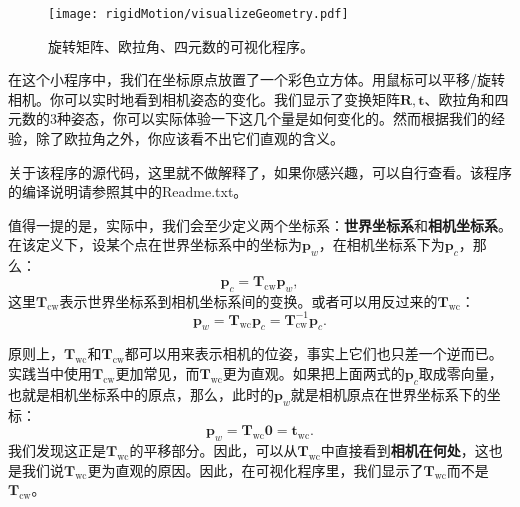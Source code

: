 \begin{figure}[!htp]
	\centering
	\texttt{[image: rigidMotion/visualizeGeometry.pdf]}
	\caption{旋转矩阵、欧拉角、四元数的可视化程序。}
	\label{fig:visualizeGeometry}
\end{figure}

在这个小程序中，我们在坐标原点放置了一个彩色立方体。用鼠标可以平移/旋转相机。你可以实时地看到相机姿态的变化。我们显示了变换矩阵$\bm{R}, \bm{t}$、欧拉角和四元数的3种姿态，你可以实际体验一下这几个量是如何变化的。然而根据我们的经验，除了欧拉角之外，你应该看不出它们直观的含义。

关于该程序的源代码，这里就不做解释了，如果你感兴趣，可以自行查看。该程序的编译说明请参照其中的Readme.txt。

值得一提的是，实际中，我们会至少定义两个坐标系：\textbf{世界坐标系}和\textbf{相机坐标系}。在该定义下，设某个点在世界坐标系中的坐标为$\bm{p}_w$，在相机坐标系下为$\bm{p}_c$，那么：
\begin{equation}
\bm{p}_c = \bm{T}_{\mathrm{cw}} \bm{p}_w,
\end{equation}
这里$\bm{T}_\mathrm{cw}$表示世界坐标系到相机坐标系间的变换。或者可以用反过来的$\bm{T}_\mathrm{wc}$：
\begin{equation}
\bm{p}_w = \bm{T}_{\mathrm{wc}} \bm{p}_c =  \bm{T}_{\mathrm{cw}}^{-1} \bm{p}_c. 
\end{equation}

原则上，$\bm{T}_{\mathrm{wc}}$和$\bm{T}_{\mathrm{cw}}$都可以用来表示相机的位姿，事实上它们也只差一个逆而已。实践当中使用$\bm{T}_{\mathrm{cw}}$更加常见，而$\bm{T}_{\mathrm{wc}}$更为直观。如果把上面两式的$\bm{p}_c$取成零向量，也就是相机坐标系中的原点，那么，此时的$\bm{p}_w$就是相机原点在世界坐标系下的坐标：
\begin{equation}
	\bm{p}_w = \bm{T}_{\mathrm{wc}} \bm{0} = \bm{t}_{\mathrm{wc}}.
\end{equation}
我们发现这正是$\bm{T}_{\mathrm{wc}}$的平移部分。因此，可以从$\bm{T}_{\mathrm{wc}}$中直接看到\textbf{相机在何处}，这也是我们说$\bm{T}_{\mathrm{wc}}$更为直观的原因。因此，在可视化程序里，我们显示了$\bm{T}_{\mathrm{wc}}$而不是$\bm{T}_{\mathrm{cw}}$。

